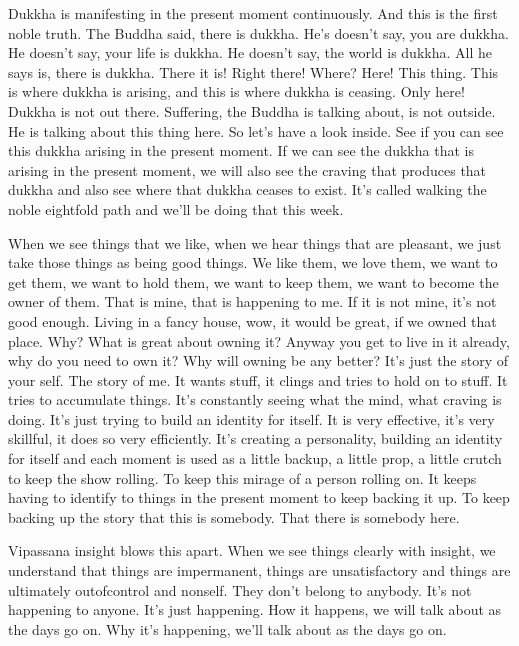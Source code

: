 \documentclass[letterpaper,10pt,english]{sphinxmanual}
\begin{document}
\sphinxAtStartPar
Dukkha is manifesting in the present moment continuously. And this is
the first noble truth. The Buddha said, there is dukkha. He’s doesn’t say, you
are dukkha. He doesn’t say, your life is dukkha. He doesn’t say, the world
  is dukkha. All he says is, there is dukkha. There it is! Right there! Where?
Here! This thing. This is where dukkha is arising, and this is where dukkha
is ceasing. Only here! Dukkha is not out there. Suffering, the Buddha is talking about, is not outside. He is talking about this thing here. So let’s have a
look inside. See if you can see this dukkha arising in the present moment. If
we can see the dukkha that is arising in the present moment, we will also see
the craving that produces that dukkha and also see where that dukkha ceases
to exist. It’s called walking the noble eightfold path and we’ll be doing that
this week.

\sphinxAtStartPar
When we see things that we like, when we hear things that are pleasant,
we just take those things as being good things. We like them, we love them,
we want to get them, we want to hold them, we want to keep them, we want
to become the owner of them. That is mine, that is happening to me. If it is
not mine, it’s not good enough. Living in a fancy house, wow, it would be
great, if we owned that place. Why? What is great about owning it? Anyway
you get to live in it already, why do you need to own it? Why will owning
be any better? It’s just the story of your self. The story of me. It wants stuff,
it clings and tries to hold on to stuff. It tries to accumulate things. It’s constantly seeing what the mind, what craving is doing. It’s just trying to build
an  identity  for  itself.  It  is  very  effective,  it’s  very  skillful,  it  does  so  very
efficiently. It’s creating a personality, building an identity for itself and each
moment  is  used  as  a  little  backup,  a  little  prop,  a  little  crutch  to  keep  the
show rolling. To keep this mirage of a person rolling on. It keeps having to
identify to things in the present moment to keep backing it up. To keep backing up the story that this is somebody. That there is somebody here.

\sphinxAtStartPar
Vipassana  insight  blows  this  apart. When  we  see  things  clearly  with
insight,  we  understand  that  things  are  impermanent,  things  are  unsatisfactory and things are ultimately out\sphinxhyphen{}of\sphinxhyphen{}control and non\sphinxhyphen{}self. They don’t belong
to anybody. It’s not happening to anyone. It’s just happening. How it happens, we will talk about as the days go on. Why it’s happening, we’ll talk
about as the days go on.
\end{document}
